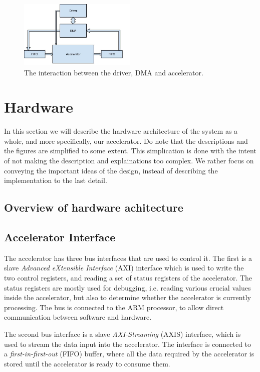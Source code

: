 \begin{figure}[h!]
  \centering
      \includegraphics[width=0.5\textwidth]{Figures/Method/DriverAcceleratorInteraction}
    \caption{The interaction between the driver, DMA and accelerator.}
    \label{fig_driver_acc_interact}
\end{figure}
 

\section{Hardware}

In this section we will describe the hardware architecture of the system as a whole, and more specifically, our accelerator. Do note that the descriptions and the figures are simplified to some extent. This simplication is done with the intent of not making the description and explainations too complex. We rather focus on conveying the important ideas of the design, instead of describing the implementation to the last detail. 

\subsection{Overview of hardware achitecture}


\subsection{Accelerator Interface}

The accelerator has three bus interfaces that are used to control it. The first is a slave \textit{Advanced eXtensible Interface} (AXI) interface which is used to write the two control registers, and reading a set of status registers of the accelerator. The status registers are mostly used for debugging, i.e. reading various crucial values inside the accelerator, but also to determine whether the accelerator is currently processing. The bus is connected to the ARM processor, to allow direct communication between software and hardware.

The second bus interface is a slave \textit{AXI-Streaming} (AXIS) interface, which is used to stream the data input into the accelerator. The interface is connected to a \textit{first-in-first-out} (FIFO) buffer, where all the data required by the accelerator is stored until the accelerator is ready to consume them. 

